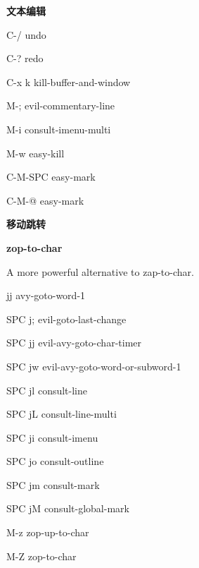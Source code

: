 \documentclass[10pt]{article}
\renewcommand\subsection[1]{\smallskip\par\textbf{\color{heading}#1}}
\newcommand\humanreadable[1]{{\par\color{default}\small\sffamily#1}}
\begin{document}
\begin{multicols}{4}
\begin{keylist}
  \subsection{文本编辑}
  \begin{keylist}
  \item[C-/] undo
  \item[C-?] redo
  \item[C-x k] kill-buffer-and-window
  \item[M-;] evil-commentary-line
  \item[M-i] consult-imenu-multi
  \item[M-w] easy-kill
  \item[C-M-SPC] easy-mark
  \item[C-M-@] easy-mark
  \end{keylist}

  \subsection{移动跳转}
  \subsection{zop-to-char}
  \humanreadable{A more powerful alternative to zap-to-char.}
  \begin{keylist}
  \item[jj] avy-goto-word-1
  \item[SPC j;] evil-goto-last-change
  \item[SPC jj] evil-avy-goto-char-timer
  \item[SPC jw] evil-avy-goto-word-or-subword-1
  \item[SPC jl] consult-line
  \item[SPC jL] consult-line-multi
  \item[SPC ji] consult-imenu
  \item[SPC jo] consult-outline
  \item[SPC jm] consult-mark
  \item[SPC jM] consult-global-mark
  \item[M-z] zop-up-to-char
  \item[M-Z] zop-to-char
  \end{keylist}


\end{keylist}
\end{multicols}
\end{document}
